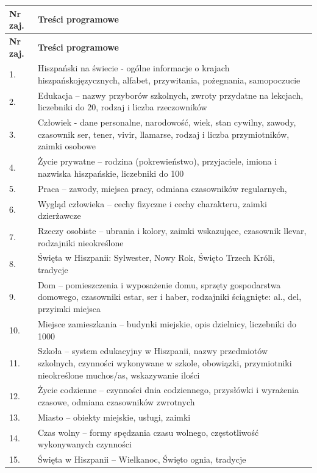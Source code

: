\documentclass[12pt, a4paper]{article}
\newcommand{\thdrule}{\noalign{\global\setlength{\extrarowheight}{0pt}}}
\newcommand{\thdend}{\noalign{\global\setlength{\extrarowheight}{3pt}}}
\begin{document}
{\scriptsize
\begin{longtable}{m{1.5cm}m{14.5cm}}
\thdrule\toprule
\rowcolor{pjatkRed} {\color{white}\textbf{Nr zaj.}} & {\color{white}\textbf{Treści programowe}} \\
\midrule\thdend
\endfirsthead
\thdrule\toprule
\rowcolor{pjatkRed} {\color{white}\textbf{Nr zaj.}} & {\color{white}\textbf{Treści programowe}} \\
\midrule\thdend
\endhead
  \rowcolor{tableRowLight} 1. & Hiszpański na świecie - ogólne informacje o krajach hiszpańskojęzycznych, alfabet, przywitania, pożegnania, samopoczucie \\
  \rowcolor{tableRowAlt} 2. & Edukacja – nazwy przyborów szkolnych, zwroty przydatne na lekcjach, liczebniki do 20, rodzaj i liczba rzeczowników \\
  \rowcolor{tableRowLight} 3. & Człowiek - dane personalne, narodowość, wiek, stan cywilny, zawody, czasownik ser, tener, vivir, llamarse, rodzaj i liczba przymiotników, zaimki osobowe \\
  \rowcolor{tableRowAlt} 4. & Życie prywatne – rodzina (pokrewieństwo), przyjaciele, imiona i nazwiska hiszpańskie, liczebniki do 100 \\
  \rowcolor{tableRowLight} 5. & Praca – zawody, miejsca pracy,  odmiana czasowników regularnych, \\
  \rowcolor{tableRowAlt} 6. & Wygląd człowieka – cechy fizyczne i cechy charakteru, zaimki dzierżawcze \\
  \rowcolor{tableRowLight} 7. & Rzeczy osobiste – ubrania i kolory, zaimki wskazujące, czasownik llevar, rodzajniki nieokreślone \\
  \rowcolor{tableRowAlt} 8. & Święta w Hiszpanii: Sylwester, Nowy Rok, Święto Trzech Króli, tradycje \\
  \rowcolor{tableRowLight} 9. & Dom – pomieszczenia i wyposażenie domu, sprzęty gospodarstwa domowego, czasowniki estar, ser i haber, rodzajniki ściągnięte: al., del, przyimki miejsca \\
  \rowcolor{tableRowAlt} 10. & Miejsce zamieszkania – budynki miejskie, opis dzielnicy, liczebniki do 1000 \\
  \rowcolor{tableRowLight} 11. & Szkoła – system edukacyjny w Hiszpanii, nazwy przedmiotów szkolnych, czynności wykonywane w szkole, obowiązki, przymiotniki nieokreślone muchos/as, wskazywanie ilości \\
  \rowcolor{tableRowAlt} 12. & Życie codzienne – czynności dnia codziennego, przysłówki i wyrażenia czasowe, odmiana czasowników zwrotnych \\
  \rowcolor{tableRowLight} 13. & Miasto – obiekty miejskie, usługi, zaimki \\
  \rowcolor{tableRowAlt} 14. & Czas wolny – formy spędzania czasu wolnego, częstotliwość wykonywanych czynności \\
  \rowcolor{tableRowLight} 15. & Święta w Hiszpanii – Wielkanoc, Święto ognia, tradycje \\
\bottomrule
\end{longtable}}
\end{document}
